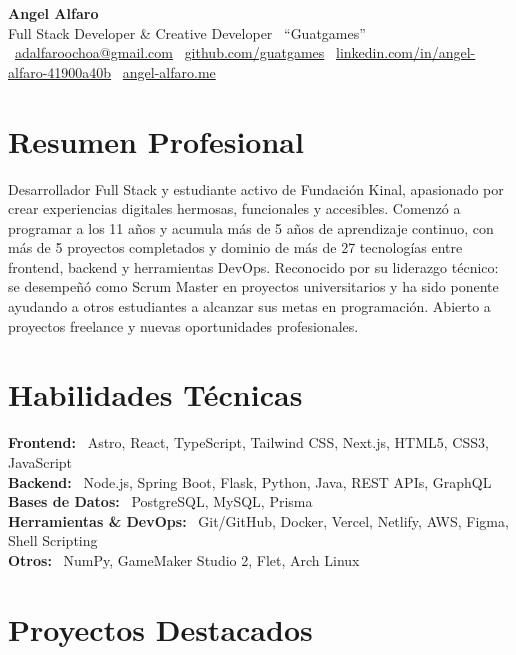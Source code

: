 \documentclass[10.5pt,a4paper]{article}
\newcommand{\iconEmail}{\faEnvelope\ }
\newcommand{\iconGithub}{\faGithub\ }
\newcommand{\iconLinkedin}{\faLinkedin\ }
\newcommand{\iconGlobe}{\faGlobe\ }
\newcommand{\iconEmail}{\Email\ }
\newcommand{\iconGithub}{}
\newcommand{\iconLinkedin}{}
\newcommand{\iconGlobe}{}
\newcommand{\skillrow}[2]{%
  \textbf{\color{darknavy}#1:} \, #2\\[3pt]
}
\begin{document}
\begin{center}
  {\Huge\bfseries\color{darknavy} Angel Alfaro}\\[3pt]
  {\large\color{accent} Full Stack Developer \& Creative Developer \textbar\ ``Guatgames''}\\[6pt]
  {\small
    \iconEmail\href{mailto:adalfaroochoa@gmail.com}{adalfaroochoa@gmail.com} \quad\textbar\quad
    \iconGithub\href{https://github.com/guatgames}{github.com/guatgames} \quad\textbar\quad
    \iconLinkedin\href{https://www.linkedin.com/in/angel-alfaro-41900a40b}{linkedin.com/in/angel-alfaro-41900a40b} \quad\textbar\quad
    \iconGlobe\href{https://angel-alfaro.me}{angel-alfaro.me}
  }
\end{center}

\vspace{2pt}

\section*{Resumen Profesional}
Desarrollador Full Stack y estudiante activo de Fundación Kinal, apasionado por crear experiencias digitales hermosas, funcionales y accesibles. Comenzó a programar a los 11 años y acumula más de 5 años de aprendizaje continuo, con más de 5 proyectos completados y dominio de más de 27 tecnologías entre frontend, backend y herramientas DevOps. Reconocido por su liderazgo técnico: se desempeñó como Scrum Master en proyectos universitarios y ha sido ponente ayudando a otros estudiantes a alcanzar sus metas en programación. Abierto a proyectos freelance y nuevas oportunidades profesionales.

\section*{Habilidades Técnicas}
\skillrow{Frontend}{Astro, React, TypeScript, Tailwind CSS, Next.js, HTML5, CSS3, JavaScript}
\skillrow{Backend}{Node.js, Spring Boot, Flask, Python, Java, REST APIs, GraphQL}
\skillrow{Bases de Datos}{PostgreSQL, MySQL, Prisma}
\skillrow{Herramientas \& DevOps}{Git/GitHub, Docker, Vercel, Netlify, AWS, Figma, Shell Scripting}
\skillrow{Otros}{NumPy, GameMaker Studio 2, Flet, Arch Linux}

\section*{Proyectos Destacados}
\end{document}
